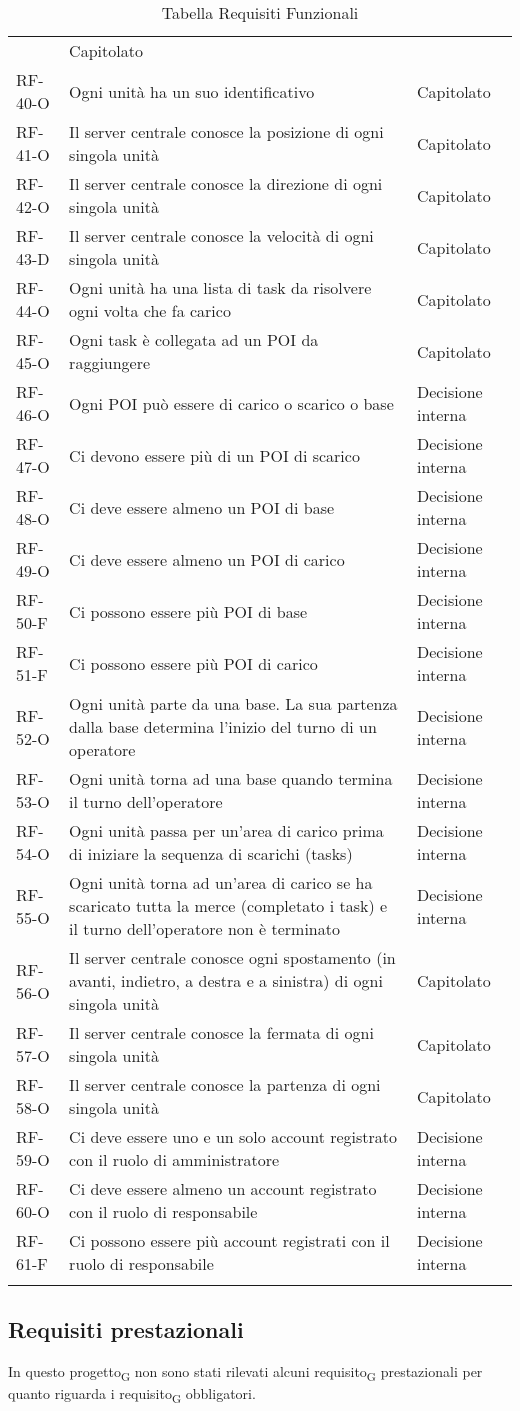 \begin{longtable}{ 
		>{}p{} 
		>{}p{}
		>{\centering}p{} }
&
Capitolato
\tabularnewline
RF-40-O
&
Ogni unità ha un suo identificativo
&
Capitolato
\tabularnewline
RF-41-O
&
Il server centrale conosce la posizione di ogni singola unità
&
Capitolato
\tabularnewline
RF-42-O
&
Il server centrale conosce la direzione di ogni singola unità
&
Capitolato
\tabularnewline
RF-43-D
&
Il server centrale conosce la velocità di ogni singola unità
&
Capitolato
\tabularnewline
RF-44-O
&
Ogni unità ha una lista di task da risolvere ogni volta che fa carico
&
Capitolato
\tabularnewline
RF-45-O
&
Ogni task è collegata ad un POI da raggiungere
&
Capitolato
\tabularnewline
RF-46-O
&
Ogni POI può essere di carico o scarico o base
&
Decisione interna
\tabularnewline
RF-47-O
&
Ci devono essere più di un POI di scarico
&
Decisione interna
\tabularnewline
RF-48-O
&
Ci deve essere almeno un POI di base
&
Decisione interna
\tabularnewline
RF-49-O
&
Ci deve essere almeno un POI di carico
&
Decisione interna
\tabularnewline
RF-50-F
&
Ci possono essere più POI di base
&
Decisione interna
\tabularnewline
RF-51-F
&
Ci possono essere più POI di carico
&
Decisione interna
\tabularnewline
RF-52-O
&
Ogni unità parte da una base. La sua partenza dalla base determina l'inizio del turno di un operatore
&
Decisione interna
\tabularnewline
RF-53-O
&
Ogni unità torna ad una base quando termina il turno dell’operatore
&
Decisione interna
\tabularnewline
RF-54-O
&
Ogni unità passa per un’area di carico prima di iniziare la sequenza di scarichi (tasks)
&
Decisione interna
\tabularnewline
RF-55-O
&
Ogni unità torna ad un'area di carico se ha scaricato tutta la merce (completato i task) e il turno dell’operatore non è terminato
&
Decisione interna
\tabularnewline
RF-56-O
&
Il server centrale conosce ogni spostamento (in avanti, indietro, a destra e a sinistra) di ogni singola unità
&
Capitolato
\tabularnewline
RF-57-O
&
Il server centrale conosce la fermata di ogni singola unità
&
Capitolato
\tabularnewline
RF-58-O
&
Il server centrale conosce la partenza di ogni singola unità
&
Capitolato
\tabularnewline
RF-59-O
&
Ci deve essere uno e un solo account registrato con il ruolo di amministratore
&
Decisione interna
\tabularnewline
RF-60-O
&
Ci deve essere almeno un account registrato con il ruolo di responsabile
&
Decisione interna
\tabularnewline
RF-61-F
&
Ci possono essere più account registrati con il ruolo di responsabile
&
Decisione interna
\tabularnewline

\caption{Tabella Requisiti Funzionali\label{ Tabella Requisiti Funzionali}}
\end{longtable}
\subsection{Requisiti prestazionali}
In questo progetto\textsubscript{G} non sono stati rilevati alcuni requisito\textsubscript{G} prestazionali per quanto riguarda i requisito\textsubscript{G} obbligatori.


